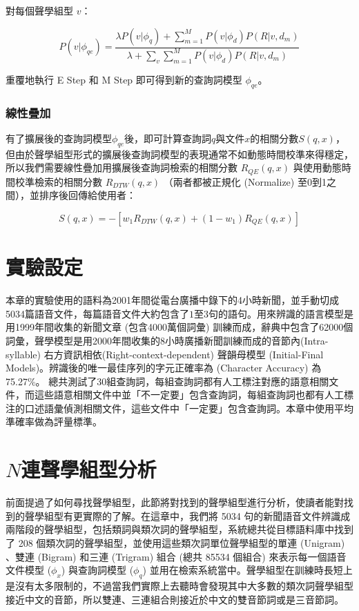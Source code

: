 對每個聲學組型 $v$：

\begin{equation}
P(v|\phi_{qe}) = \frac{\lambda P(v|\phi_q)+\sum^M_{m=1} P(v|\phi_d) P(R|v, d_m)}{\lambda + \sum_v \sum^M_{m=1} P(v|\phi_d) P(R|v, d_m)}
\end{equation}

重覆地執行 E Step 和 M Step 即可得到新的查詢詞模型 $\phi_{qe}$。

\subsubsection{線性疊加}
有了擴展後的查詢詞模型$\phi_{qe}$後，即可計算查詢詞$q$與文件$x$的相關分數$S(q, x)$，但由於聲學組型形式的擴展後查詢詞模型的表現通常不如動態時間校準來得穩定，所以我們需要線性疊加用擴展後查詢詞檢索的相關分數 $R_{QE}(q, x)$ 與使用動態時間校準檢索的相關分數 $R_{DTW} (q, x)$ （兩者都被正規化 (Normalize) 至0到1之間），並排序後回傳給使用者：

\begin{equation}
\label{equ:chap4_prf_in}
S(q, x) = -[w_1 R_{DTW} (q, x) + (1-w_1) R_{QE} (q, x)]
\end{equation}

\section{實驗設定}
\label{sec:chap4_exp_setup}
本章的實驗使用的語料為2001年間從電台廣播中錄下的4小時新聞，並手動切成5034篇語音文件，每篇語音文件大約包含了$1至3$句的語句。用來辨識的語言模型是用1999年間收集的新聞文章 (包含4000萬個詞彙) 訓練而成，辭典中包含了62000個詞彙，聲學模型是用2000年間收集的8小時廣播新聞訓練而成的音節內(Intra-syllable) 右方資訊相依(Right-context-dependent) 聲韻母模型 (Initial-Final Models)。辨識後的唯一最佳序列的字元正確率為 (Character Accuracy) 為75.27\%。
總共測試了30組查詢詞，每組查詢詞都有人工標注對應的語意相關文件，而這些語意相關文件中並「不一定要」包含查詢詞，每組查詢詞也都有人工標注的口述語彙偵測相關文件，這些文件中「一定要」包含查詢詞。本章中使用平均準確率做為評量標準。

\section{$N$連聲學組型分析}
\label{sec:acp_exp_setup}
前面提過了如何尋找聲學組型，此節將對找到的聲學組型進行分析，使讀者能對找到的聲學組型有更實際的了解。在這章中，我們將 5034 句的新聞語音文件辨識成兩階段的聲學組型，包括類詞與類次詞的聲學組型，系統總共從目標語料庫中找到了 208 個類次詞的聲學組型，並使用這些類次詞單位聲學組型的單連 (Unigram) 、雙連 (Bigram) 和三連 (Trigram) 組合 (總共 85534 個組合) 來表示每一個語音文件模型 ($\phi_x$) 與查詢詞模型 ($\phi_q$)
並用在檢索系統當中。聲學組型在訓練時長短上是沒有太多限制的，不過當我們實際上去聽時會發現其中大多數的類次詞聲學組型接近中文的音節，所以雙連、三連組合則接近於中文的雙音節詞或是三音節詞。

